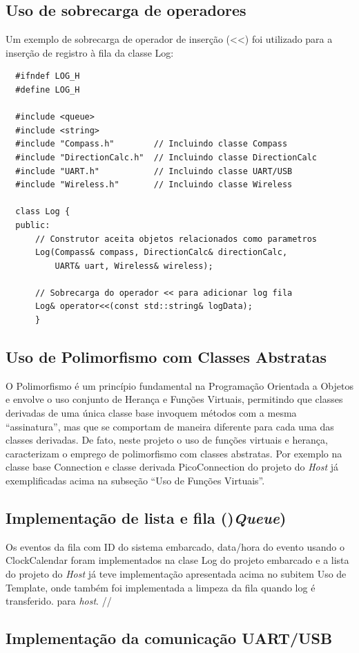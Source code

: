 \documentclass[10pt,twocolumn,letterpaper]{article}
\begin{document}
\subsection{Uso de sobrecarga de operadores}
Um exemplo de sobrecarga de operador de inserção (<<) foi utilizado para a inserção de registro à fila da classe Log:
{\scriptsize
\begin{verbatim}
  #ifndef LOG_H
  #define LOG_H
  
  #include <queue>
  #include <string>
  #include "Compass.h"        // Incluindo classe Compass
  #include "DirectionCalc.h"  // Incluindo classe DirectionCalc
  #include "UART.h"           // Incluindo classe UART/USB
  #include "Wireless.h"       // Incluindo classe Wireless
  
  class Log {
  public:
      // Construtor aceita objetos relacionados como parametros
      Log(Compass& compass, DirectionCalc& directionCalc, 
          UART& uart, Wireless& wireless);
  
      // Sobrecarga do operador << para adicionar log fila
      Log& operator<<(const std::string& logData);
      }  
\end{verbatim}
}

\subsection{Uso de Polimorfismo com Classes Abstratas}
O Polimorfismo é um princípio fundamental na Programação Orientada a Objetos e envolve o uso conjunto de Herança e Funções Virtuais, 
permitindo que classes derivadas de uma única classe base invoquem métodos com a mesma ``assinatura'', mas que se comportam de maneira diferente para cada uma das classes derivadas. 
De fato, neste projeto o uso de funções virtuais e herança, caracterizam o emprego de polimorfismo com classes abstratas. Por exemplo na classe base Connection e classe derivada PicoConnection do projeto do \emph{Host} já exemplificadas acima na subseção ``Uso de Funções Virtuais''.


\subsection[short]{Implementação de lista e fila ()\emph{Queue})}
Os eventos da fila com ID do sistema embarcado, data/hora do evento usando o 
ClockCalendar foram implementados na clase Log do projeto embarcado e a lista do projeto do \emph{Host} já teve implementação apresentada acima no subitem Uso de Template, onde também foi implementada a limpeza da fila quando log é transferido.
para \emph{host}.
//\subsection[short]{Implementação da comunicação UART/USB}
\end{document}
